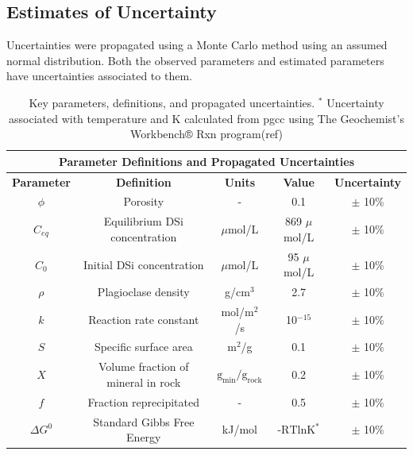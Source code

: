 \FloatBarrier


\subsection{Estimates of Uncertainty}

Uncertainties were propagated using a Monte Carlo method using an assumed normal distribution. Both the observed parameters and estimated parameters have uncertainties associated to them.


\begin{table}[H]
    \centering
    \renewcommand{\arraystretch}{1.3} %
    {\small
    \begin{tabular}{|c|c|c|c|c|}
        \hline
        \multicolumn{5}{|c|}{\textbf{Parameter Definitions and Propagated Uncertainties}} \\  
        \hline
        \textbf{Parameter} & \textbf{Definition} & \textbf{Units} & \textbf{Value} & \textbf{Uncertainty} \\  
        \hline
        $\phi$ & Porosity & - & 0.1 & $\pm$ 10\% \\  
        $C_{eq}$ & Equilibrium DSi concentration & $\mu$mol/L & 869 $\mu$mol/L & $\pm$ 10\% \\  
        $C_0$ & Initial DSi concentration & $\mu$mol/L & 95 $\mu$mol/L & $\pm$ 10\% \\  
        $\rho$ & Plagioclase density & g/cm$^3$ & 2.7 & $\pm$ 10\% \\  
        $k$ & Reaction rate constant & mol/m$^2$/s & 10$^{-15}$ & $\pm$ 10\% \\  
        $S$ & Specific surface area & m$^2$/g & 0.1 & $\pm$ 10\% \\  
        $X$ & Volume fraction of mineral in rock & $\text{g}_{\text{min}}/\text{g}_{\text{rock}}$ & 0.2 & $\pm$ 10\% \\   
        $f$ & Fraction reprecipitated & - & 0.5 & $\pm$ 10\% \\
        $\Delta G^0$ & Standard Gibbs Free Energy & kJ/mol & $\text{-RTlnK}^*$ & $\pm$ 10\% \\
        \hline
    \end{tabular}}
    \caption{Key parameters, definitions, and propagated uncertainties. $^*$ Uncertainty associated with temperature and K calculated from pgcc using The Geochemist's Workbench® Rxn program(ref)}
    \label{tab:parameters_with_uncertainty}
\end{table}

\FloatBarrier




